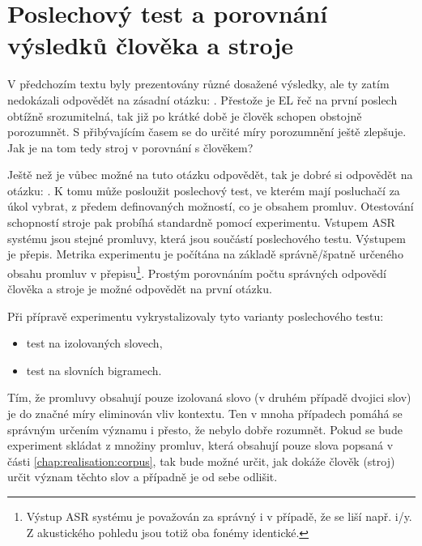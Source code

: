 \section{Poslechový test a porovnání výsledků člověka a stroje}
\label{chap:realisation:listening}

V předchozím textu byly prezentovány různé dosažené výsledky, ale ty zatím nedokázali odpovědět na zásadní otázku: . Přestože je EL řeč na první poslech obtížně srozumitelná, tak již po krátké době je člověk schopen obstojně porozumnět. S přibývajícím časem se do určité míry porozumnění ještě zlepšuje. Jak je na tom tedy stroj v porovnání s člověkem?

Ještě než je vůbec možné na tuto otázku odpovědět, tak je dobré si odpovědět na otázku: . K tomu může posloužit poslechový test, ve kterém mají posluchačí za úkol vybrat, z předem definovaných možností, co je obsahem promluv. Otestování schopností stroje pak probíhá standardně pomocí experimentu. Vstupem ASR systému jsou stejné promluvy, která jsou součástí poslechového testu. Výstupem je přepis. Metrika experimentu je počítána na základě správně/špatně určeného obsahu promluv v přepisu\footnote{Výstup ASR systému je považován za správný i v případě, že se liší např. i/y. Z akustického pohledu jsou totiž oba fonémy identické.}. Prostým porovnáním počtu správných odpovědí člověka a stroje je možné odpovědět na první  otázku.

Při přípravě experimentu vykrystalizovaly tyto varianty poslechového testu:

\begin{itemize}
  \item test na izolovaných slovech,
  \item test na slovních bigramech.
\end{itemize}

\noindent Tím, že promluvy obsahují pouze izolovaná slovo (v druhém případě dvojici slov) je do značné míry eliminován vliv kontextu. Ten v mnoha případech pomáhá se správným určením významu i přesto, že nebylo dobře rozumnět. Pokud se bude experiment skládat z množiny promluv, která obsahují pouze slova popsaná v části \ref{chap:realisation:corpus}, tak bude možné určit, jak  dokáže člověk (stroj) určit význam těchto slov a případně je od sebe odlišit.

